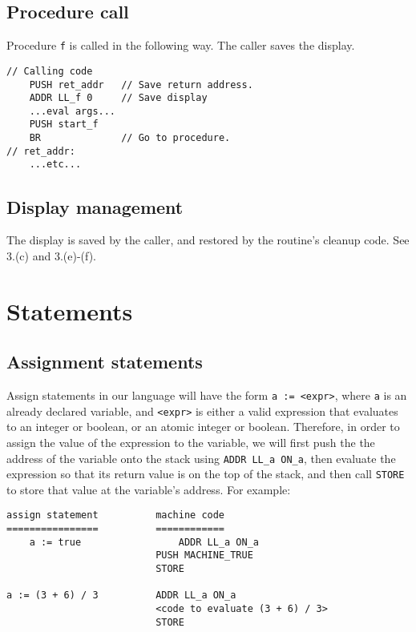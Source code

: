 \documentclass[11pt]{article}
\begin{document}
\subsection{Procedure call}

Procedure \texttt{f} is called in the following way.  The caller saves the
display.

\begin{verbatim}
// Calling code
    PUSH ret_addr   // Save return address.
    ADDR LL_f 0     // Save display
    ...eval args...
    PUSH start_f
    BR              // Go to procedure.
// ret_addr:
    ...etc...
\end{verbatim}

\subsection{Display management}

The display is saved by the caller, and restored by the routine's cleanup code.
See 3.(c) and 3.(e)-(f).

\section{Statements}

\subsection{Assignment statements}

Assign statements in our language will have the form \texttt{a := <expr>}, where \texttt{a} is an already declared variable, and \texttt{<expr>} is either a valid expression that evaluates to an integer or boolean, or an atomic integer or boolean. Therefore, in order to assign the value of the expression to the variable, we will first push the the address of the variable onto the stack using \texttt{ADDR LL\_a ON\_a}, then evaluate the expression so that its return value is on the top of the stack, and then call \texttt{STORE} to store that value at the variable's address. For example:

\begin{verbatim}
assign statement          machine code
================          ============
    a := true                 ADDR LL_a ON_a
                          PUSH MACHINE_TRUE
                          STORE

a := (3 + 6) / 3          ADDR LL_a ON_a
                          <code to evaluate (3 + 6) / 3>
                          STORE
\end{verbatim}
\end{document}
